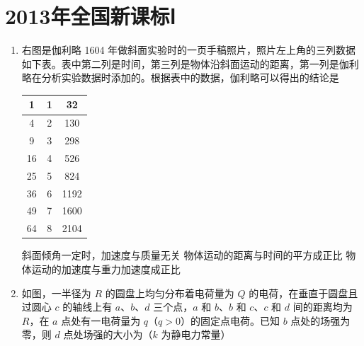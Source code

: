 \documentclass[\gkver]{gaokaozhenti}
\begin{document}
\chapter{2013年全国新课标Ⅰ}

\begin{enumerate}
\item
右图是伽利略 1604 年做斜面实验时的一页手稿照片，照片左上角的三列数据如下表。表中第二列是时间，第三列是物体沿斜面运动的距离，第一列是伽利略在分析实验数据时添加的。根据表中的数据，伽利略可以得出的结论是


\begin{center}
\begin{tabular}{|c|c|c|}
\hline
1 & 1 & 32 \\ \hline
4 & 2 & 130 \\ \hline
9 & 3 & 298 \\ \hline
16 & 4 & 526 \\ \hline
25 & 5 & 824 \\ \hline
36 & 6 & 1192 \\ \hline
49 & 7 & 1600 \\ \hline
64 & 8 & 2104 \\ \hline
\end{tabular}
\end{center}

{斜面倾角一定时，加速度与质量无关}
{物体运动的距离与时间的平方成正比}
{物体运动的加速度与重力加速度成正比}


\item
如图，一半径为 $R$ 的圆盘上均匀分布着电荷量为 $Q$ 的电荷，在垂直于圆盘且过圆心 $c$ 的轴线上有 $a$、$b$、$d$ 三个点，$a$ 和 $b$、$b$ 和 $c$、$c$ 和 $d$ 间的距离均为 $R$，在 $a$ 点处有一电荷量为 $q$（$q>0$）的固定点电荷。已知 $b$ 点处的场强为零，则 $d$ 点处场强的大小为（$k$ 为静电力常量）


\end{enumerate}
\end{document}
